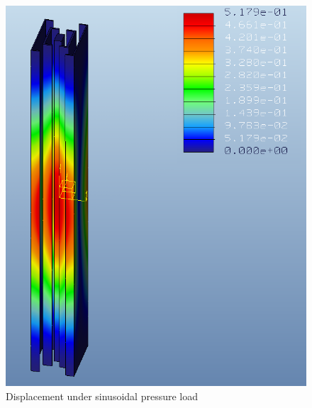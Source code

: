 \documentclass[12pt,letterpaper]{report}
\begin{document}
		\begin{figure}[H]
			\centering
			\includegraphics[width=.5\textwidth]{SinusoidalAssyDisp}
			\caption{Displacement under sinusoidal pressure load}
			\label{fig:SinusoidalPressDisp}
		\end{figure}
		\graphicspath{ {..} }
		
\end{document}
